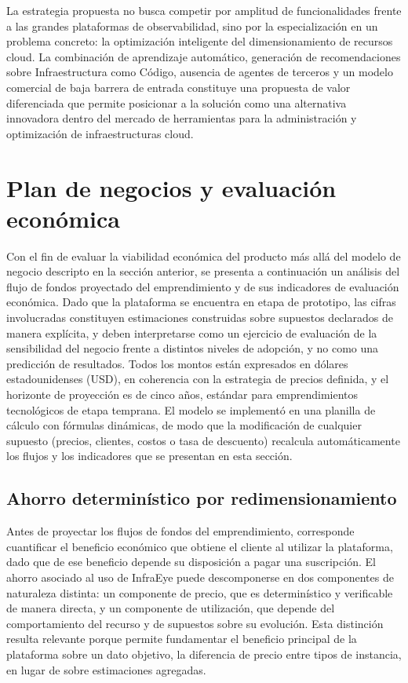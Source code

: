 La estrategia propuesta no busca competir por amplitud de funcionalidades frente a las grandes plataformas de observabilidad, sino por la especialización en un problema concreto: la optimización inteligente del dimensionamiento de recursos cloud. La combinación de aprendizaje automático, generación de recomendaciones sobre Infraestructura como Código, ausencia de agentes de terceros y un modelo comercial de baja barrera de entrada constituye una propuesta de valor diferenciada que permite posicionar a la solución como una alternativa innovadora dentro del mercado de herramientas para la administración y optimización de infraestructuras cloud.

\section{Plan de negocios y evaluación económica}
\label{sec:plan-de-negocios}

Con el fin de evaluar la viabilidad económica del producto más allá del modelo de negocio descripto en la sección anterior, se presenta a continuación un análisis del flujo de fondos proyectado del emprendimiento y de sus indicadores de evaluación económica. Dado que la plataforma se encuentra en etapa de prototipo, las cifras involucradas constituyen estimaciones construidas sobre supuestos declarados de manera explícita, y deben interpretarse como un ejercicio de evaluación de la sensibilidad del negocio frente a distintos niveles de adopción, y no como una predicción de resultados. Todos los montos están expresados en dólares estadounidenses (USD), en coherencia con la estrategia de precios definida, y el horizonte de proyección es de cinco años, estándar para emprendimientos tecnológicos de etapa temprana. El modelo se implementó en una planilla de cálculo con fórmulas dinámicas, de modo que la modificación de cualquier supuesto (precios, clientes, costos o tasa de descuento) recalcula automáticamente los flujos y los indicadores que se presentan en esta sección.

\subsection{Ahorro determinístico por redimensionamiento}
\label{sec:ahorro-deterministico}

Antes de proyectar los flujos de fondos del emprendimiento, corresponde cuantificar el beneficio económico que obtiene el cliente al utilizar la plataforma, dado que de ese beneficio depende su disposición a pagar una suscripción. El ahorro asociado al uso de InfraEye puede descomponerse en dos componentes de naturaleza distinta: un componente de precio, que es determinístico y verificable de manera directa, y un componente de utilización, que depende del comportamiento del recurso y de supuestos sobre su evolución. Esta distinción resulta relevante porque permite fundamentar el beneficio principal de la plataforma sobre un dato objetivo, la diferencia de precio entre tipos de instancia, en lugar de sobre estimaciones agregadas.

